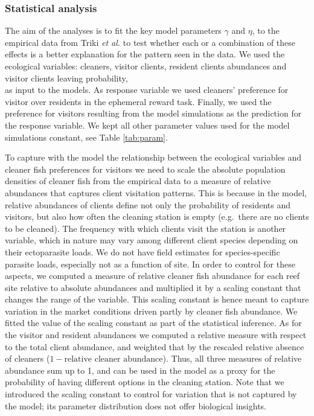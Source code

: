 \documentclass[]{rsos}%
\begin{document}
\hypertarget{statistical-analysis}{%
\subsubsection{Statistical analysis}\label{statistical-analysis}}

The aim of the analyses is to fit the key model parameters
\(\gamma\) and \(\eta\), to the empirical data from Triki \emph{et al.}
\citep{triki_Biological_2019, triki_Brain_2020} to test whether each or
a combination of these effects is a better explanation for the pattern
seen in the data. We used the ecological variables: cleaners, visitor clients,
resident clients abundances and visitor clients leaving probability,\\
as input to the models. As response variable we used cleaners'
preference for visitor over residents in the ephemeral reward task.
Finally, we used the preference for visitors resulting from the
model simulations as the prediction for the response variable.
We kept all other parameter values used for the model simulations constant,
see Table \ref{tab:param}.

To capture with the model the relationship between the ecological
variables and cleaner fish preferences for visitors we need to scale
the absolute population densities of cleaner fish from the empirical data
to a measure of relative abundances that captures client visitation patterns.
This is because in the model, relative abundances of clients
define not only the probability of residents and visitors,
but also how often the cleaning station is empty (e.g.~there are no
clients to be cleaned). The frequency with which clients visit the station
is another variable, which in nature may vary among different client species
depending on their ectoparasite loads. We do not have field estimates
for species-specific parasite loads, especially not as a function of site.
In order to control for these aspects, we computed a measure of relative
cleaner fish abundance for each reef site relative to
absolute abundances and multiplied it
by a scaling constant that changes the range of the variable. This scaling
constant is hence meant to capture variation in the market conditions driven
partly by cleaner fish abundance. We fitted the value of the scaling constant as
part of the statistical inference. As for the visitor and resident
abundances we computed a relative measure with respect to the
total client abundance, and weighted that by the rescaled relative absence
of cleaners (\(1-\text{relative cleaner abundance}\)). Thus, all three measures
of relative abundance sum up to 1, and can be used in the model as a proxy
for the probability of having different options in the cleaning station.
Note that we introduced the scaling constant to control for variation that
is not captured by the model; its parameter distribution does not offer
biological insights.
\end{document}

